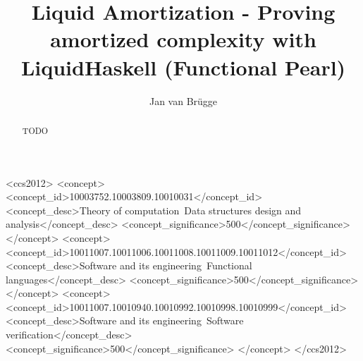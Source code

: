 \documentclass[sigplan,screen]{acmart}
\begin{document}
\title{Liquid Amortization - Proving amortized complexity with LiquidHaskell (Functional Pearl)}

\author{Jan van Brügge}


\begin{abstract}
TODO
\end{abstract}

\begin{CCSXML}
<ccs2012>
   <concept>
       <concept_id>10003752.10003809.10010031</concept_id>
       <concept_desc>Theory of computation~Data structures design and analysis</concept_desc>
       <concept_significance>500</concept_significance>
       </concept>
   <concept>
       <concept_id>10011007.10011006.10011008.10011009.10011012</concept_id>
       <concept_desc>Software and its engineering~Functional languages</concept_desc>
       <concept_significance>500</concept_significance>
       </concept>
   <concept>
       <concept_id>10011007.10010940.10010992.10010998.10010999</concept_id>
       <concept_desc>Software and its engineering~Software verification</concept_desc>
       <concept_significance>500</concept_significance>
       </concept>
 </ccs2012>
\end{CCSXML}

\end{document}
